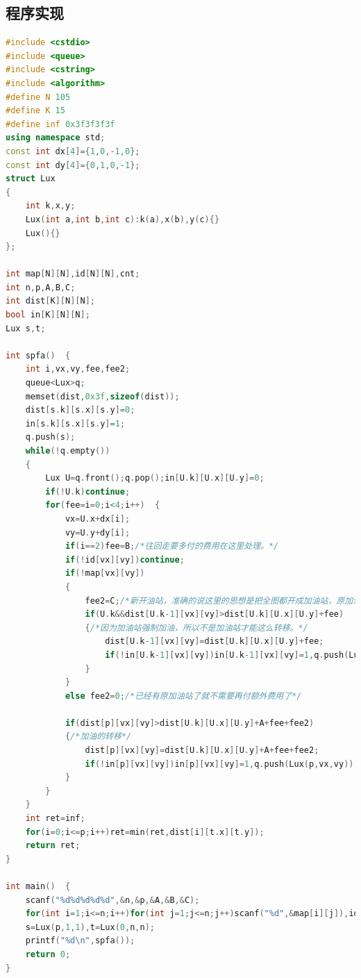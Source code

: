 \documentclass[UTF8]{ctexart}
\begin{document}
    \subsection{程序实现}
    \begin{small}
    \begin{lstlisting}[language=c++]
#include <cstdio>
#include <queue>
#include <cstring>
#include <algorithm>
#define N 105
#define K 15
#define inf 0x3f3f3f3f
using namespace std;
const int dx[4]={1,0,-1,0};
const int dy[4]={0,1,0,-1};
struct Lux
{
    int k,x,y;
    Lux(int a,int b,int c):k(a),x(b),y(c){}
    Lux(){}
};

int map[N][N],id[N][N],cnt;
int n,p,A,B,C;
int dist[K][N][N];
bool in[K][N][N];
Lux s,t;

int spfa()  {
    int i,vx,vy,fee,fee2;
    queue<Lux>q;
    memset(dist,0x3f,sizeof(dist));
    dist[s.k][s.x][s.y]=0;
    in[s.k][s.x][s.y]=1;
    q.push(s);
    while(!q.empty())
    {
        Lux U=q.front();q.pop();in[U.k][U.x][U.y]=0;
        if(!U.k)continue;
        for(fee=i=0;i<4;i++)  {
            vx=U.x+dx[i];
            vy=U.y+dy[i];
            if(i==2)fee=B;/*往回走要多付的费用在这里处理。*/
            if(!id[vx][vy])continue;
            if(!map[vx][vy])
            {
                fee2=C;/*新开油站，准确的说这里的思想是把全图都开成加油站，原加油站强制加油，新加油站不强制，但加油要多付钱*/
                if(U.k&&dist[U.k-1][vx][vy]>dist[U.k][U.x][U.y]+fee)
                {/*因为加油站强制加油，所以不是加油站才能这么转移。*/
                    dist[U.k-1][vx][vy]=dist[U.k][U.x][U.y]+fee;
                    if(!in[U.k-1][vx][vy])in[U.k-1][vx][vy]=1,q.push(Lux(U.k-1,vx,vy));
                }
            }
            else fee2=0;/*已经有原加油站了就不需要再付额外费用了*/

            if(dist[p][vx][vy]>dist[U.k][U.x][U.y]+A+fee+fee2)
            {/*加油的转移*/
                dist[p][vx][vy]=dist[U.k][U.x][U.y]+A+fee+fee2;
                if(!in[p][vx][vy])in[p][vx][vy]=1,q.push(Lux(p,vx,vy));
            }
        }
    }
    int ret=inf;
    for(i=0;i<=p;i++)ret=min(ret,dist[i][t.x][t.y]);
    return ret;
}

int main()  {
    scanf("%d%d%d%d%d",&n,&p,&A,&B,&C);
    for(int i=1;i<=n;i++)for(int j=1;j<=n;j++)scanf("%d",&map[i][j]),id[i][j]=++cnt;
    s=Lux(p,1,1),t=Lux(0,n,n);
    printf("%d\n",spfa());
    return 0;
}
    \end{lstlisting}
    \end{small}
\end{document}
